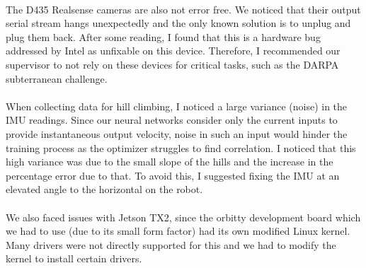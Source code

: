 \paragraph{}
The D435 Realsense cameras are also not error free. We noticed that their output serial stream hangs unexpectedly and the only known solution is to unplug and plug them back. After some reading, I found that this is a hardware bug addressed by Intel as unfixable on this device. Therefore, I recommended our supervisor to not rely on these devices for critical tasks, such as the DARPA subterranean challenge.

\paragraph{}
When collecting data for hill climbing, I noticed a large variance (noise) in the IMU readings. Since our neural networks consider only the current inputs to provide instantaneous output velocity, noise in such an input would hinder the training process as the optimizer struggles to find correlation. I noticed that this high variance was due to the small slope of the hills and the increase in the percentage error due to that. To avoid this, I suggested fixing the IMU at an elevated angle to the horizontal on the robot.

\paragraph{}
We also faced issues with Jetson TX2, since the orbitty development board which we had to use (due to its small form factor) had its own modified Linux kernel. Many drivers were not directly supported for this and we had to modify the kernel to install certain drivers.